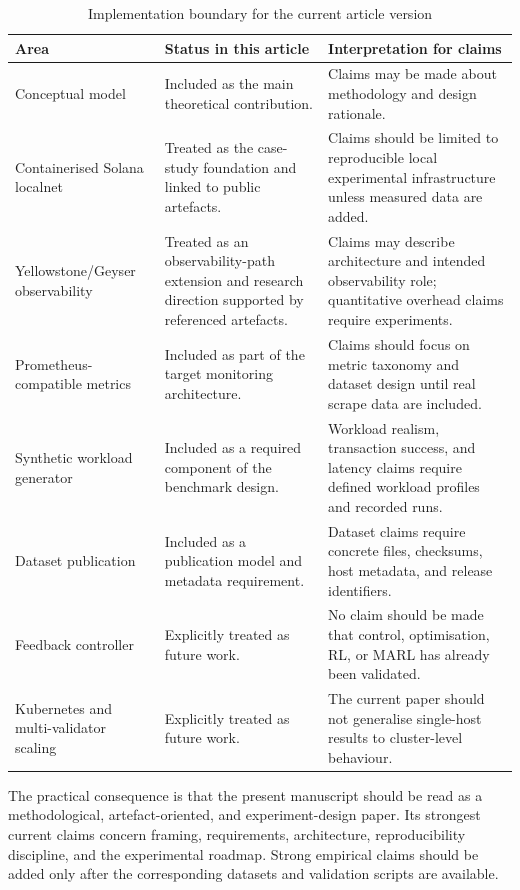 \documentclass[11pt,a4paper]{article}
\begin{document}
\begin{table}[H]
\centering
\small
\caption{Implementation boundary for the current article version}
\label{tab:implementation-boundary}
\begin{tabularx}{\textwidth}{L{3.1cm}Y Y}
\toprule
\textbf{Area} & \textbf{Status in this article} & \textbf{Interpretation for claims} \\
\midrule
Conceptual model & Included as the main theoretical contribution. & Claims may be made about methodology and design rationale. \\
Containerised Solana localnet & Treated as the case-study foundation and linked to public artefacts. & Claims should be limited to reproducible local experimental infrastructure unless measured data are added. \\
Yellowstone/Geyser observability & Treated as an observability-path extension and research direction supported by referenced artefacts. & Claims may describe architecture and intended observability role; quantitative overhead claims require experiments. \\
Prometheus-compatible metrics & Included as part of the target monitoring architecture. & Claims should focus on metric taxonomy and dataset design until real scrape data are included. \\
Synthetic workload generator & Included as a required component of the benchmark design. & Workload realism, transaction success, and latency claims require defined workload profiles and recorded runs. \\
Dataset publication & Included as a publication model and metadata requirement. & Dataset claims require concrete files, checksums, host metadata, and release identifiers. \\
Feedback controller & Explicitly treated as future work. & No claim should be made that control, optimisation, RL, or MARL has already been validated. \\
Kubernetes and multi-validator scaling & Explicitly treated as future work. & The current paper should not generalise single-host results to cluster-level behaviour. \\
\bottomrule
\end{tabularx}
\end{table}

The practical consequence is that the present manuscript should be read as a methodological, artefact-oriented, and experiment-design paper. Its strongest current claims concern framing, requirements, architecture, reproducibility discipline, and the experimental roadmap. Strong empirical claims should be added only after the corresponding datasets and validation scripts are available.
\end{document}
